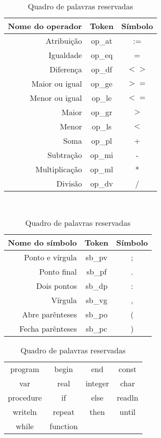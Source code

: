 \documentclass {article}
\begin{document}
			\begin{table}
				\begin{minipage}[ht]{0.5\textwidth}
					\centering
					\begin{tabular}{rcc}
						\toprule
						Nome do operador & Token & Símbolo\\
						\hline
						\hline
							Atribuição & op\_at & := \\
							Igualdade & op\_eq & = \\ 
							Diferença &  op\_df & $<>$ \\ 
							Maior ou igual & op\_ge & $>=$ \\ 
							Menor ou igual & op\_le & $<=$ \\ 
							Maior & op\_gr & $>$ \\
							Menor &op\_ls & $<$ \\ 
							Soma & op\_pl & + \\ 
							Subtração & op\_mi & - \\ 
							Multiplicação & op\_ml & * \\
							Divisão & op\_dv & / \\
						\bottomrule
					\end{tabular}
					\caption{Quadro de operadores}
					\label{table:op}
				\end{minipage}
				~
				\begin{minipage}[ht]{0.5\textwidth}
					\centering
					\begin{tabular}{rcc}
						\toprule
						Nome do símbolo & Token & Símbolo\\
						\hline
						\hline
							Ponto e vírgula & sb\_pv & ; \\
							Ponto final &  sb\_pf & . \\ 
							Dois pontos & sb\_dp & : \\ 
							Vírgula & sb\_vg & , \\
							Abre parênteses &sb\_po & ( \\ 
							Fecha parênteses & sb\_pc & ) \\ 
						\bottomrule
					\end{tabular}
					\caption{Quadro de símbolos}
					\label{table:simb}

					\vspace{5mm}
					
					\begin{tabular}{cccc}
						\toprule
						program & begin & end & const \\
						var & real & integer& char\\
						procedure & if & else & readln \\
						writeln & repeat & then & until\\
						while & function & & \\
						\bottomrule
					\end{tabular}
					\caption{Quadro de palavras reservadas}
					\label{table:reserv}
				\end{minipage}
		
			\end{table}
\end{document}
